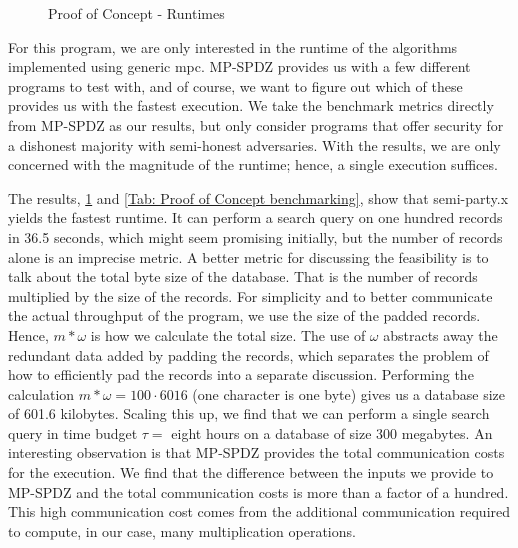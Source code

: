 \begin{figure} [tbh]
    \caption{Proof of Concept - Runtimes}
    \label{fig:ProofOfConceptRuntimes}
    \centering
\end{figure}

For this program, we are only interested in the runtime of the algorithms implemented using generic \acrshort{mpc}. MP-SPDZ provides us with a few different programs to test with, and of course, we want to figure out which of these provides us with the fastest execution. We take the benchmark metrics directly from MP-SPDZ as our results, but only consider programs that offer security for a dishonest majority with semi-honest adversaries. With the results, we are only concerned with the magnitude of the runtime; hence, a single execution suffices.

The results, \cref{fig:ProofOfConceptRuntimes} and \cref{Tab: Proof of Concept benchmarking}, show that semi-party.x yields the fastest runtime. It can perform a search query on one hundred records in 36.5 seconds, which might seem promising initially, but the number of records alone is an imprecise metric. A better metric for discussing the feasibility is to talk about the total byte size of the database. That is the number of records multiplied by the size of the records. For simplicity and to better communicate the actual throughput of the program, we use the size of the padded records. Hence, $ m * \omega $ is how we calculate the total size. The use of $ \omega $  abstracts away the redundant data added by padding the records, which separates the problem of how to efficiently pad the records into a separate discussion. Performing the calculation $ m * \omega = 100 \cdot 6016 $ (one character is one byte) gives us a database size of 601.6 kilobytes. Scaling this up, we find that we can perform a single search query in time budget $ \tau = $ eight hours on a database of size 300 megabytes. An interesting observation is that MP-SPDZ provides the total communication costs for the execution. We find that the difference between the inputs we provide to MP-SPDZ and the total communication costs is more than a factor of a hundred. This high communication cost comes from the additional communication required to compute, in our case, many multiplication operations.

